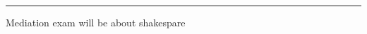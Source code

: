 \startsection[title={2024-11-21 Mediation HowTo}]



\blank
\hrule
\blank

Mediation exam will be about shakespare
\stopsection


